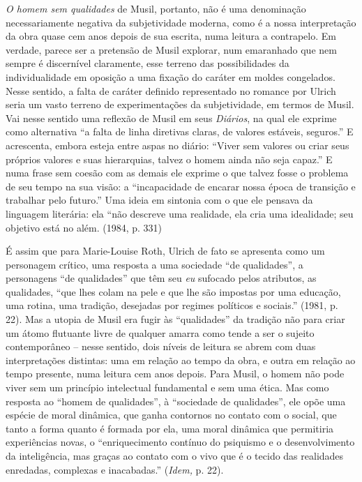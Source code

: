 \emph{O homem sem qualidades} de Musil, portanto, não é uma denominação
necessariamente negativa da subjetividade moderna, como é a nossa
interpretação da obra quase cem anos depois de sua escrita, numa leitura
a contrapelo. Em verdade, parece ser a pretensão de Musil explorar, num
emaranhado que nem sempre é discernível claramente, esse terreno das
possibilidades da individualidade em oposição a uma fixação do caráter
em moldes congelados. Nesse sentido, a falta de caráter definido
representado no romance por Ulrich seria um vasto terreno de
experimentações da subjetividade, em termos de Musil. Vai nesse sentido
uma reflexão de Musil em seus \emph{Diários}, na qual ele exprime como
alternativa ``a falta de linha diretivas claras, de valores estáveis,
seguros.'' E acrescenta, embora esteja entre aspas no diário: ``Viver
sem valores ou criar seus próprios valores e suas hierarquias, talvez o
homem ainda não seja capaz.'' E numa frase sem coesão com as demais ele
exprime o que talvez fosse o problema de seu tempo na sua visão: a
``incapacidade de encarar nossa época de transição e trabalhar pelo
futuro.'' Uma ideia em sintonia com o que ele pensava da linguagem
literária: ela ``não descreve uma realidade, ela cria uma idealidade;
seu objetivo está no além. (1984, p. 331)

É assim que para Marie-Louise Roth, Ulrich de fato se apresenta como um
personagem crítico, uma resposta a uma sociedade ``de qualidades'', a
personagens ``de qualidades'' que têm seu \emph{eu} sufocado pelos
atributos, as qualidades, ``que lhes colam na pele e que lhe são
impostas por uma educação, uma rotina, uma tradição, desejadas por
regimes políticos e sociais.'' (1981, p. 22). Mas a utopia de Musil era
fugir às ``qualidades'' da tradição não para criar um átomo flutuante
livre de qualquer amarra como tende a ser o sujeito contemporâneo --
nesse sentido, dois níveis de leitura se abrem com duas interpretações
distintas: uma em relação ao tempo da obra, e outra em relação ao tempo
presente, numa leitura cem anos depois. Para Musil, o homem não pode
viver sem um princípio intelectual fundamental e sem uma ética. Mas como
resposta ao ``homem de qualidades'', à ``sociedade de qualidades'', ele
opõe uma espécie de moral dinâmica, que ganha contornos no contato com o
social, que tanto a forma quanto é formada por ela, uma moral dinâmica
que permitiria experiências novas, o ``enriquecimento contínuo do
psiquismo e o desenvolvimento da inteligência, mas graças ao contato com
o vivo que é o tecido das realidades enredadas, complexas e
inacabadas.'' (\emph{Idem,} p. 22).

